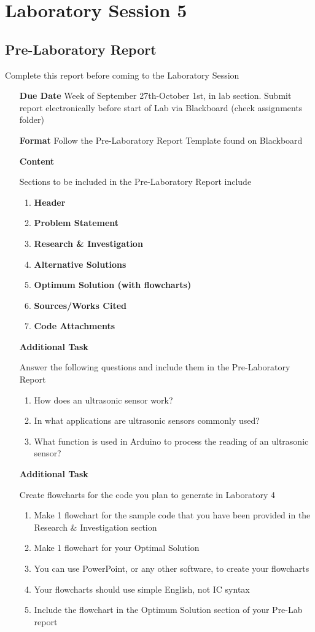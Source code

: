 \chapter{Laboratory Session 5}
\section{Pre-Laboratory Report}
	Complete this report before coming to the Laboratory Session
\begin{itemize}
	\item[\textbf{Due Date}]{Week of September 27th-October 1st, \the\year \space in lab section. Submit report electronically before start of Lab via Blackboard (check assignments folder)}
	\item[\textbf{Format}]{Follow the Pre-Laboratory Report Template found on Blackboard}
	\item[\textbf{Content}]{Sections to be included in the Pre-Laboratory Report include
		\begin{enumerate}
			\item \textbf{Header}
			\item \textbf{Problem Statement}
			\item \textbf{Research \& Investigation}
			\item \textbf{Alternative Solutions}
			\item \textbf{Optimum Solution (with flowcharts)}
			\item \textbf{Sources/Works Cited}
			\item \textbf{Code Attachments}
		\end{enumerate}
		
	}

	\item[\textbf{Additional Task}]{Answer the following questions and include them in the Pre-Laboratory Report
		\begin{enumerate}[label=\alph*.]
			\item How does an ultrasonic sensor work?
			\item In what applications are ultrasonic sensors commonly used?
			\item What function is used in Arduino to process the reading of an ultrasonic sensor? 
		\end{enumerate}	
	}
	
	\item[\textbf{Additional Task}]{Create flowcharts for the code you plan to generate in Laboratory 4
		\begin{enumerate}[label=\alph*.]
			\item Make 1 flowchart for the sample code that you have been provided in the Research \& Investigation section 
			\item Make 1 flowchart for your Optimal Solution
			\item You can use PowerPoint, or any other software, to create your flowcharts
			\item Your flowcharts should use simple English, not IC syntax
			\item Include the flowchart in the Optimum Solution section of your Pre-Lab report
		\end{enumerate}
		
	}
\end{itemize}
